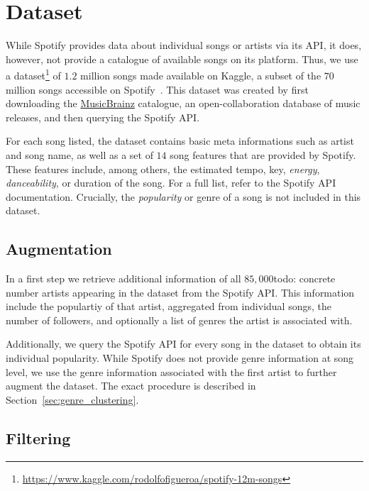 \documentclass{article}
\newcommand{\todo}[1]{{\color{red}todo: #1}}
\begin{document}
\section{Dataset}

While Spotify provides data about individual songs or artists via its API, it does, however, not provide a catalogue of available songs on its platform. Thus, we use a dataset\footnote{\url{https://www.kaggle.com/rodolfofigueroa/spotify-12m-songs}} of $1.2$ million songs made available on Kaggle, a subset of the $70$ million songs accessible on Spotify~\cite{ingham_2020}. This dataset was created by first downloading the \href{https://musicbrainz.org/}{MusicBrainz} catalogue, an open-collaboration database of music releases, and then querying the Spotify API. 

For each song listed, the dataset contains basic meta informations such as artist and song name, as well as a set of $14$ song features that are provided by Spotify. These features include, among others, the estimated tempo, key, \emph{energy}, \emph{danceability}, or duration of the song. For a full list, refer to the Spotify API documentation. Crucially, the \emph{popularity} or genre of a song is not included in this dataset.

\subsection{Augmentation}
In a first step we retrieve additional information of all $85,000$\todo{concrete number} artists appearing in the dataset from the Spotify API. This information include the populartiy of that artist, aggregated from individual songs, the number of followers, and optionally a list of genres the artist is associated with.

Additionally, we query the Spotify API for every song in the dataset to obtain its individual popularity. While Spotify does not provide genre information at song level, we use the genre information associated with the first artist to further augment the dataset. The exact procedure is described in Section~\ref{sec:genre_clustering}. 

\subsection{Filtering}
\end{document}
